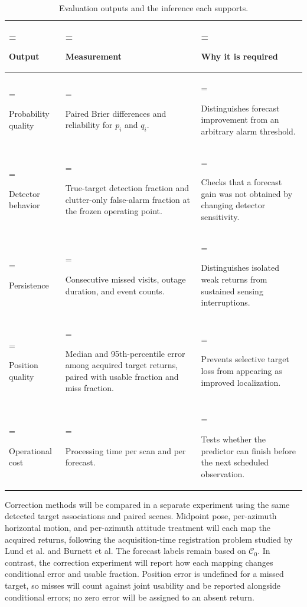 \documentclass[10pt,letterpaper]{article}
\begin{document}
\begin{table}[H]
\centering
\caption{Evaluation outputs and the inference each supports.}
\label{tab:benchmark-outputs}
\small
\begin{tabularx}{\textwidth}{@{}>{\hsize=0.7\hsize\linewidth=\hsize\raggedright\arraybackslash}X>{\hsize=1.3\hsize\linewidth=\hsize\raggedright\arraybackslash}X>{\hsize=1.0\hsize\linewidth=\hsize\raggedright\arraybackslash}X@{}}
\toprule
Output & Measurement & Why it is required \\
\midrule
Probability quality & Paired Brier differences and reliability for $p_i$ and $q_i$. & Distinguishes forecast improvement from an arbitrary alarm threshold. \\
Detector behavior & True-target detection fraction and clutter-only false-alarm fraction at the frozen operating point. & Checks that a forecast gain was not obtained by changing detector sensitivity. \\
Persistence & Consecutive missed visits, outage duration, and event counts. & Distinguishes isolated weak returns from sustained sensing interruptions. \\
Position quality & Median and 95th-percentile error among acquired target returns, paired with usable fraction and miss fraction. & Prevents selective target loss from appearing as improved localization. \\
Operational cost & Processing time per scan and per forecast. & Tests whether the predictor can finish before the next scheduled observation. \\
\bottomrule
\end{tabularx}
\end{table}

Correction methods will be compared in a separate experiment using the same detected target associations and paired scenes. Midpoint pose, per-azimuth horizontal motion, and per-azimuth attitude treatment will each map the acquired returns, following the acquisition-time registration problem studied by Lund et al. and Burnett et al. \cite{Lund2018SeaIceDrift,Burnett2021MotionDistortion} The forecast labels remain based on $\mathcal{C}_0$. In contrast, the correction experiment will report how each mapping changes conditional error and usable fraction. Position error is undefined for a missed target, so misses will count against joint usability and be reported alongside conditional errors; no zero error will be assigned to an absent return.
\end{document}
